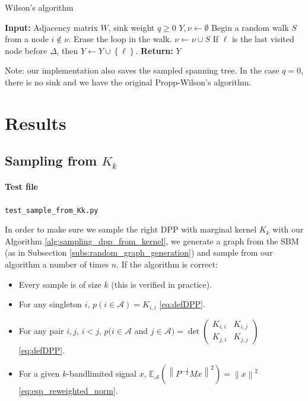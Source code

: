\documentclass{article}
\newcommand{\norm}[1]{\left\|#1\right\|}
\begin{document}
\begin{algorithm}[ht]
\caption{Wilson's algorithm}
\label{alg:wilson_algorithm}
\begin{algorithmic} %
    \STATE \textbf{Input:} Adjacency matrix $W$, sink weight $q \geq 0$
    \STATE $Y, \nu \leftarrow \emptyset$
			\STATE Begin a random walk $S$ from a node $i \notin \nu$.
				\STATE Erase the loop in the walk.
				\STATE $\nu \leftarrow \nu \cup S$
					\STATE If $\ell$ is the last visited node before $\Delta$, then $Y \leftarrow Y \cup \left\{\ell\right\}$.
				\ENDIF
			\ENDIF
		\ENDWHILE
		\STATE \textbf{Return:} $Y$
\end{algorithmic}
Note: our implementation also saves the sampled spanning tree. In the case $q = 0$, there is no sink and we have the original Propp-Wilson's algorithm.
\end{algorithm}


\newpage
\section{Results}


\subsection[Sampling from Kk]{Sampling from $K_k$}


\paragraph{Test file} \verb#test_sample_from_Kk.py#


In order to make sure we sample the right DPP with marginal kernel $K_k$ with our Algorithm \ref{alg:sampling_dpp_from_kernel}, we generate a graph from the SBM (as in Subsection \ref{subs:random_graph_generation}) and sample from our algorithm a number of times $n$. If the algorithm is correct:
\begin{itemize}
\item Every sample is of size $k$ (this is verified in practice).
\item For any singleton $i$, $p(i \in \mathcal{A}) = K_{i, i}$ \eqref{eq:defDPP}.
\item For any pair $i, j$, $i < j$, $p(i \in \mathcal{A} $ and $ j \in \mathcal{A}) = \det \begin{pmatrix} K_{i, i} & K_{i, j} \\ K_{j, i} & K_{j, j} \end{pmatrix}$ \eqref{eq:defDPP}.
\item For a given $k$-bandlimited signal $x$, $\mathbb{E}_\mathcal{A} \left( \norm{P^{-\frac{1}{2}} M x}^2 \right) = \norm{x}^2$ \eqref{eq:esp_reweighted_norm}.
\end{itemize}
\end{document}
